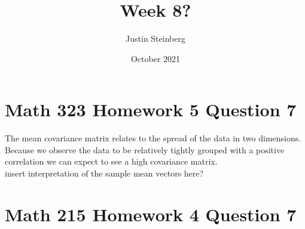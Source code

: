 \documentclass{article}
\title{Week 8?}
\author{Justin Steinberg}
\date{October 2021}
\begin{document}
\maketitle

\section{Math 323 Homework 5 Question 7}

\begin{center}
    The mean covariance matrix relates to the spread of the data in two dimensions. Because we observe the data to be relatively tightly grouped with a positive correlation we can expect to see a high covariance matrix.\\insert interpretation of the sample mean vectors here?
\end{center}

\section{Math 215 Homework 4 Question 7}

\end{document}
